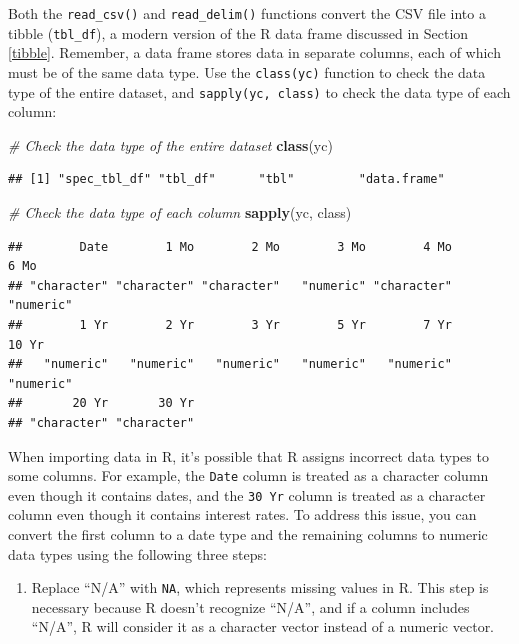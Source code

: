 \documentclass[
]{book}
\newenvironment{Shaded}{\begin{snugshade}}{\end{snugshade}}
\newcommand{\CommentTok}[1]{\textcolor[rgb]{0.56,0.35,0.01}{\textit{#1}}}
\newcommand{\FunctionTok}[1]{\textcolor[rgb]{0.13,0.29,0.53}{\textbf{#1}}}
\newcommand{\NormalTok}[1]{#1}
\providecommand{\tightlist}{%
  \setlength{\itemsep}{0pt}\setlength{\parskip}{0pt}}
\begin{document}
Both the \texttt{read\_csv()} and \texttt{read\_delim()} functions convert the CSV file into a tibble (\texttt{tbl\_df}), a modern version of the R data frame discussed in Section \ref{tibble}. Remember, a data frame stores data in separate columns, each of which must be of the same data type. Use the \texttt{class(yc)} function to check the data type of the entire dataset, and \texttt{sapply(yc,\ class)} to check the data type of each column:

\begin{Shaded}
\begin{Highlighting}[]
\CommentTok{\# Check the data type of the entire dataset}
\FunctionTok{class}\NormalTok{(yc)}
\end{Highlighting}
\end{Shaded}

\begin{verbatim}
## [1] "spec_tbl_df" "tbl_df"      "tbl"         "data.frame"
\end{verbatim}

\begin{Shaded}
\begin{Highlighting}[]
\CommentTok{\# Check the data type of each column}
\FunctionTok{sapply}\NormalTok{(yc, class)}
\end{Highlighting}
\end{Shaded}

\begin{verbatim}
##        Date        1 Mo        2 Mo        3 Mo        4 Mo        6 Mo 
## "character" "character" "character"   "numeric" "character"   "numeric" 
##        1 Yr        2 Yr        3 Yr        5 Yr        7 Yr       10 Yr 
##   "numeric"   "numeric"   "numeric"   "numeric"   "numeric"   "numeric" 
##       20 Yr       30 Yr 
## "character" "character"
\end{verbatim}

When importing data in R, it's possible that R assigns incorrect data types to some columns. For example, the \texttt{Date} column is treated as a character column even though it contains dates, and the \texttt{30\ Yr} column is treated as a character column even though it contains interest rates. To address this issue, you can convert the first column to a date type and the remaining columns to numeric data types using the following three steps:

\begin{enumerate}
\def\labelenumi{\arabic{enumi}.}
\tightlist
\item
  Replace ``N/A'' with \texttt{NA}, which represents missing values in R. This step is necessary because R doesn't recognize ``N/A'', and if a column includes ``N/A'', R will consider it as a character vector instead of a numeric vector.
\end{enumerate}
\end{document}
